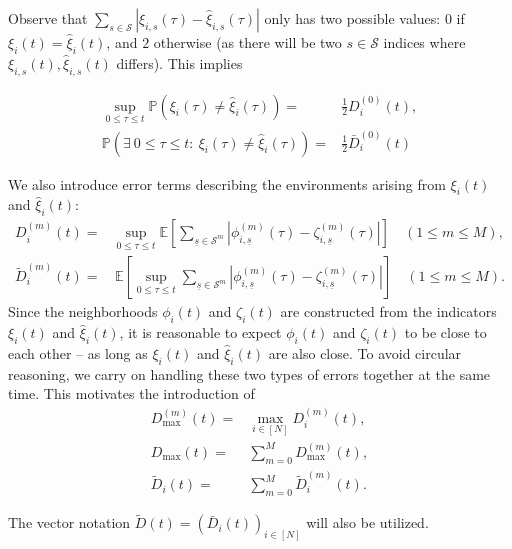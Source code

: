 \documentclass{article}
\newcommand{\pr}{\mathbb{P}}
\newcommand{\E}{\mathbb{E}}
\newcommand{\1}[1]{{\mathds{1}}_{\left\{#1\right\}}}
\renewcommand{\S}{\mathcal{S}}
\newcommand{\rem}[1]{{#1}}
\begin{document}
	Observe that  $\sum_{s \in \S} \left|\xi_{i,s}(\tau)-\hat{\xi}_{i,s}(\tau) \right|$ only has two possible values: $0$ if $\xi_{i}(t)=\hat{\xi}_i(t)$, and $2$ otherwise (as there will be two $s \in \mathcal{S}$ indices where $\xi_{i,s}(t),\hat{\xi}_{i,s}(t)$ differs). This implies
	
	\begin{align*}
		\sup_{0 \leq \tau \leq t}\pr \left( \xi_{i}(\tau) \neq \hat{\xi}_{i}(\tau) \right)=& \frac{1}{2}D_i^{\rem{(0)}}(t), \\
		\pr \left( \exists \ 0 \leq \tau \leq t: \ \xi_{i}(\tau) \neq \hat{\xi}_{i}(\tau) \right)=& \frac{1}{2}\bar{D}_i^{\rem{(0)}}(t) 
	\end{align*}
	
	
	We also introduce error terms describing the environments arising from $\xi_{i}(t)$ and $\hat{\xi}_{i}(t)$:
	\begin{align*}
		D_{i}^{(m)}(t)=& \sup_{0 \leq \tau \leq t} \E \left[\sum_{\underline{s} \in \S^m} \left|\phi_{i,\underline{s}}^{(m)}(\tau)-\zeta_{i,\underline{s}}^{(m)}(\tau) \right| \right]\quad (1 \leq m \leq M),\\
		\tilde{D}_{i}^{(m)}(t)=& \, \E \left[\sup_{0 \leq \tau \leq t} \sum_{\underline{s} \in \S^m} \left|\phi_{i,\underline{s}}^{(m)}(\tau)-\zeta_{i,\underline{s}}^{(m)}(\tau) \right| \right]\quad (1 \leq m \leq M).
	\end{align*}
	Since the neighborhoods $\phi_{i}(t)$ and $\zeta_{i}(t)$ are constructed from the indicators $\xi_{i}(t)$ and $\hat{\xi}_{i}(t)$, it is reasonable to expect $\phi_{i}(t)$ and $\zeta_{i}(t)$ to be close to each other -- as long as $\xi_i(t)$ and $\hat{\xi}_{i}(t)$ are also close. To avoid circular reasoning, we carry on handling these two types of errors together at the same time. This motivates the introduction of
	\begin{align*}
		D_{\max}^{(m)}(t)=& \max_{i \in [N]} D_{i}^{(m)}(t), \\
		D_{\max}(t)=& \sum_{m=0}^{M} D_{\max}^{(m)}(t), \\
		\tilde{D}_{i}(t)=& \sum_{m=0}^{M}\tilde{D}_{i}^{(m)}(t).
	\end{align*}
	
	The vector notation $\tilde{D}(t)=\left(\bar{D}_{i}(t) \right)_{i \in [N]}$ will also be utilized.
	
\end{document}
